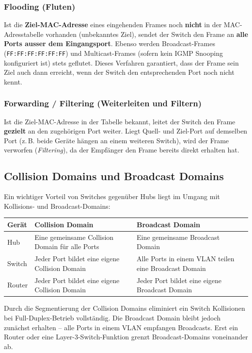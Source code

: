\documentclass[11pt, oneside, numbers=nönddot]{scrbook}
\begin{document}
\subsubsection{Flooding (Fluten)}
Ist die \textbf{Ziel-MAC-Adresse} eines eingehenden Frames noch \textbf{nicht} in der MAC-Adresstabelle vorhanden (unbekanntes Ziel), sendet der Switch den Frame an \textbf{alle Ports ausser dem Eingangsport}. Ebenso werden Broadcast-Frames (\texttt{FF:FF:FF:FF:FF:FF}) und Multicast-Frames (sofern kein IGMP Snooping konfiguriert ist) stets geflutet. Dieses Verfahren garantiert, dass der Frame sein Ziel auch dann erreicht, wenn der Switch den entsprechenden Port noch nicht kennt.

\subsubsection{Forwarding / Filtering (Weiterleiten und Filtern)}
Ist die Ziel-MAC-Adresse in der Tabelle bekannt, leitet der Switch den Frame \textbf{gezielt} an den zugehörigen Port weiter. Liegt Quell- und Ziel-Port auf demselben Port (z.\,B. beide Geräte hängen an einem weiteren Switch), wird der Frame verworfen (\textit{Filtering}), da der Empfänger den Frame bereits direkt erhalten hat.

\subsection{Collision Domains und Broadcast Domains}
Ein wichtiger Vorteil von Switches gegenüber Hubs liegt im Umgang mit Kollisions- und Broadcast-Domains:

\begin{longtable}{|p{4cm}|p{5.2cm}|p{4.2cm}|}
\hline
\textbf{Gerät} & \textbf{Collision Domain} & \textbf{Broadcast Domain} \\
\hline
Hub & Eine gemeinsame Collision Domain für alle Ports & Eine gemeinsame Broadcast Domain \\
\hline
Switch & Jeder Port bildet eine eigene Collision Domain & Alle Ports in einem VLAN teilen eine Broadcast Domain \\
\hline
Router & Jeder Port bildet eine eigene Collision Domain & Jeder Port bildet eine eigene Broadcast Domain \\
\hline
\end{longtable}

Durch die Segmentierung der Collision Domains eliminiert ein Switch Kollisionen bei Full-Duplex-Betrieb vollständig. Die Broadcast Domain bleibt jedoch zunächst erhalten -- alle Ports in einem VLAN empfangen Broadcasts. Erst ein Router oder eine Layer-3-Switch-Funktion grenzt Broadcast-Domains voneinander ab.
\end{document}
